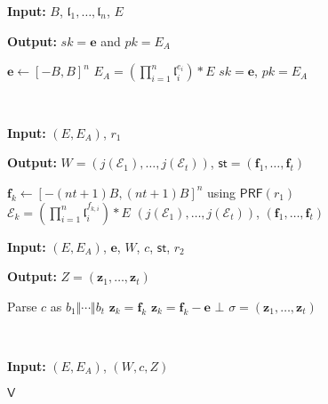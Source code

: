 \documentclass{llncs}
\newcommand{\E}{\mathcal{E}}
\renewcommand{\l}{\mathfrak{l}}
\newcommand{\e}{\mathbf{e}}
\newcommand{\f}{\mathbf{f}}
\newcommand{\z}{\mathbf{z}}
\newcommand{\IGen}{\mathsf{IGen}}
\newcommand{\PP}{\mathsf{P}}
\newcommand{\VV}{\mathsf{V}}
\newcommand{\St}{\textsf{st}}
\newcommand{\PRF}{\mathsf{PRF}}
\begin{document}
\begin{figure}
\begin{minipage}{.45\textwidth}
\begin{algorithm}[H]
	\caption{$\IGen$}
	\textbf{Input:} $B$, $\l_1, \dots, \l_n$, $E$

	\textbf{Output:} $sk =\e$ and $pk = E_A$

	\begin{algorithmic}[1]
		\State $\e \leftarrow [-B,B]^n$ 
		\State $E_A = ( \prod_{i=1}^n \l_i^{e_i} ) * E$
		\State \Return $sk= \e$, $pk = E_A$
	\end{algorithmic}
\end{algorithm}
\end{minipage}
 \ \ \ \ \ \ \ \ \ \ \ \ 
\begin{minipage}{0.45\textwidth}
\begin{algorithm}[H]
	\caption{$\PP_1$}
	\textbf{Input:} $(E,E_A)$,  $r_1$

	\textbf{Output:} $W = ( j(\E_1) , \dots, j(\E_t) )$, $\St = (\f_1, \dots, \f_t )$

	\begin{algorithmic}[1]
		\State $\f_k \leftarrow [-(nt+1)B,(nt+1)B]^n$ using $\PRF( r_1 )$
		\State $\E_k = ( \prod_{i=1}^n \l_i^{f_{k,i}} ) * E$
		\EndFor
		\State \Return $( j(\E_1) , \dots, j(\E_t) )$, $(\f_1, \dots, \f_t )$
	\end{algorithmic}
\end{algorithm}
\end{minipage}



\begin{minipage}{0.45\textwidth}
\begin{algorithm}[H]
	\caption{$\PP_2$}
	\textbf{Input:} $(E,E_A)$, $\e$, $W$, $c$, $\St$, $r_2$

	\textbf{Output:} $Z = (\z_1, \dots, \z_t)$

	\begin{algorithmic}[1]
		\State Parse $c$ as $b_1 \Vert \cdots \Vert b_t$
		\State $\z_k = \f_k$
		\Else
		\State $\z_k = \f_k - \e$
		\EndIf
		\If{$\z_{k} \not\in [-ntB,ntB]^n$} \State \Return $\bot$ \EndIf
		\EndFor
		\State \Return $\sigma = (\z_1, \dots, \z_t)$
	\end{algorithmic}
\end{algorithm}
\end{minipage}
 \ \ \ \ \ \ \ \ \ \ \ \ 
\begin{minipage}{0.45\textwidth}
\begin{algorithm}[H]
	\caption{$\VV$}
	\textbf{Input:} $(E,E_A)$, $(W,c,Z)$


\end{algorithm}
\end{minipage}
\end{figure}
\end{document}
